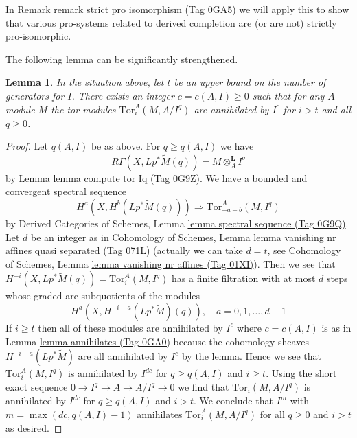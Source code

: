 \documentclass{amsart}
\theoremstyle{plain}
\newtheorem{lemma}[subsection]{Lemma}
\theoremstyle{definition}
\theoremstyle{remark}
\numberwithin{equation}{subsection}
\begin{document}
\medskip\noindent
In Remark \href{https://stacks.math.columbia.edu/tag/0GA5}{remark strict pro isomorphism (Tag 0GA5)} we will apply this to show that
various pro-systems related to derived completion are (or are not)
strictly pro-isomorphic.

\medskip\noindent
The following lemma can be significantly strengthened.



\begin{lemma}
\label{lemma-annihilates-tors}
In the situation above, let $t$ be an upper bound on the number of
generators for $I$. There exists an integer $c = c(A, I) \geq 0$
such that for any $A$-module $M$ the tor modules
$\text{Tor}_i^A(M, A/I^q)$ are annihilated by $I^c$ for $i > t$
and all $q \geq 0$.
\end{lemma}

\begin{proof}
Let $q(A, I)$ be as above. For $q \geq q(A, I)$ we have
$$
R\Gamma(X, Lp^*\widetilde{M}(q)) = M \otimes_A^\mathbf{L} I^q
$$
by Lemma \href{https://stacks.math.columbia.edu/tag/0G9Z}{lemma compute tor Iq (Tag 0G9Z)}.
We have a bounded and convergent spectral sequence
$$
H^a(X, H^b(Lp^*\widetilde{M}(q))) \Rightarrow
\text{Tor}_{-a - b}^A(M, I^q)
$$
by Derived Categories of Schemes, Lemma \href{https://stacks.math.columbia.edu/tag/0G9Q}{lemma spectral sequence (Tag 0G9Q)}.
Let $d$ be an integer as in Cohomology of Schemes, Lemma
\href{https://stacks.math.columbia.edu/tag/071L}{lemma vanishing nr affines quasi separated (Tag 071L)}
(actually we can take $d = t$, see
Cohomology of Schemes, Lemma \href{https://stacks.math.columbia.edu/tag/01XI}{lemma vanishing nr affines (Tag 01XI)}).
Then we see that $H^{-i}(X, Lp^*\widetilde{M}(q)) = \text{Tor}_i^A(M, I^q)$
has a finite filtration with at most $d$ steps whose graded are
subquotients of the modules
$$
H^a(X, H^{- i - a}(Lp^*\widetilde{M})(q)),\quad
a = 0, 1, \ldots, d - 1
$$
If $i \geq t$ then all of these modules are annihilated
by $I^c$ where $c = c(A, I)$ is as in Lemma \href{https://stacks.math.columbia.edu/tag/0GA0}{lemma annihilates (Tag 0GA0)}
because the cohomology sheaves $H^{- i - a}(Lp^*\widetilde{M})$
are all annihilated by $I^c$ by the lemma. Hence we see that
$\text{Tor}_i^A(M, I^q)$ is annihilated by $I^{dc}$ for
$q \geq q(A, I)$ and $i \geq t$. Using the short exact sequence
$0 \to I^q \to A \to A/I^q \to 0$ we find that
$\text{Tor}_i(M, A/I^q)$ is annihilated by $I^{dc}$ for $q \geq q(A, I)$
and $i > t$. We conclude that $I^m$ with $m = \max(dc, q(A, I) - 1)$
annihilates $\text{Tor}_i^A(M, A/I^q)$ for all $q \geq 0$
and $i > t$ as desired.
\end{proof}
\end{document}
